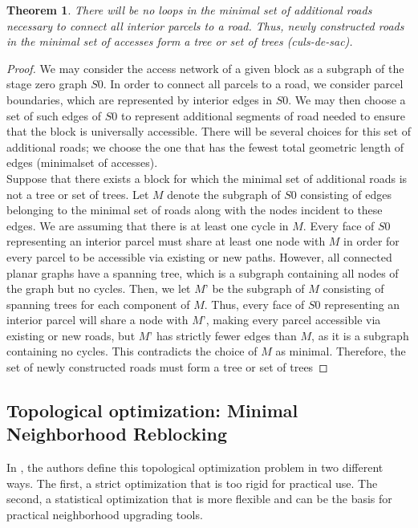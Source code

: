 \documentclass[10pt]{article}
\newtheorem{theorem}{Theorem}
\begin{document}
\begin{theorem}
    There will be no loops in the minimal set of additional roads necessary to connect all interior parcels to a road. Thus, newly constructed roads in the minimal set of accesses form a tree or set of trees (culs-de-sac).
\end{theorem}
\begin{proof}
We may consider the access network of a given block as a subgraph of the stage zero graph $S0$. In order to connect all parcels to a road, we consider parcel boundaries, which are represented by interior edges in $S0$. We may then choose a set of such edges of $S0$ to represent additional segments of road needed to ensure that the block is universally accessible. There will be several choices for this set of additional roads; we choose the one that has the fewest total geometric length of edges (minimalset of accesses).\\

Suppose that there exists a block for which the minimal set of additional roads is not a tree or set of trees. Let $M$ denote the subgraph of $S0$ consisting of edges belonging to the minimal set of roads along with the nodes incident to these edges. We are assuming that there is at least one cycle in $M$. Every face of $S0$ representing an interior parcel must share at least one node with $M$ in order for every parcel to be accessible via existing or new paths. However, all connected planar graphs have a spanning tree, which is a subgraph containing all nodes of the graph but no cycles. Then, we let $M’$ be the subgraph of $M$ consisting of spanning trees for each component of $M$. Thus, every face of $S0$ representing an interior parcel will share a node with $M’$, making every parcel accessible via existing or new roads, but $M’$ has strictly fewer edges than $M$, as it is a subgraph containing no cycles. This contradicts the choice of $M$ as minimal. Therefore, the set of newly constructed roads must form a tree or set of trees
\end{proof}

\subsection{Topological optimization: Minimal Neighborhood Reblocking}

 In \cite{bre}, the authors define this topological optimization problem in two different ways. The first, a strict optimization that is too rigid for practical use. The second, a statistical optimization that is more flexible and can be the basis for practical neighborhood upgrading tools.\\
\end{document}
